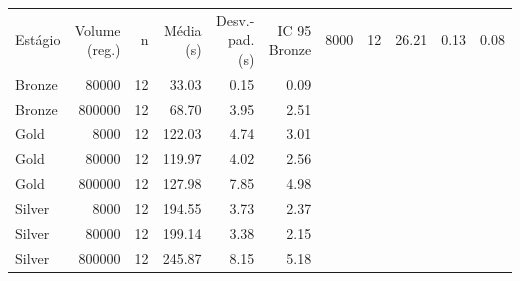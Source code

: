 \begin{tabular}{lrrrrr}
\toprule
Estágio & Volume (reg.) & n & Média (s) & Desv.-pad. (s) & IC 95%
\midrule
Bronze & 8000 & 12 & 26.21 & 0.13 & 0.08 \\
Bronze & 80000 & 12 & 33.03 & 0.15 & 0.09 \\
Bronze & 800000 & 12 & 68.70 & 3.95 & 2.51 \\
Gold & 8000 & 12 & 122.03 & 4.74 & 3.01 \\
Gold & 80000 & 12 & 119.97 & 4.02 & 2.56 \\
Gold & 800000 & 12 & 127.98 & 7.85 & 4.98 \\
Silver & 8000 & 12 & 194.55 & 3.73 & 2.37 \\
Silver & 80000 & 12 & 199.14 & 3.38 & 2.15 \\
Silver & 800000 & 12 & 245.87 & 8.15 & 5.18 \\
\bottomrule
\end{tabular}
